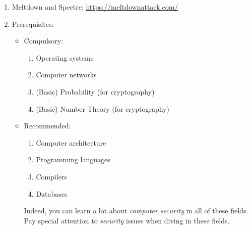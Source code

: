 \documentclass{article}
\begin{document}
\begin{enumerate}
    \item Meltdown and Spectre:
    \href{https://meltdownattack.com/}{https://meltdownattack.com/}
    \item Prerequisites:
    \begin{itemize}
        \item Compulsory:
        \begin{enumerate}
            \item Operating systems
            \item Computer networks
            \item (Basic) Probability (for cryptography)
            \item (Basic) Number Theory (for cryptography)
        \end{enumerate}
        \item Recommended:
        \begin{enumerate}
            \item Computer architecture
            \item Programming languages
            \item Compilers
            \item Databases
        \end{enumerate}
        Indeed, you can learn a lot about \emph{computer security} in all of these fields.
        Pay special attention to \emph{security} issues when diving in these fields.
    \end{itemize}
\end{enumerate}
\end{document}
